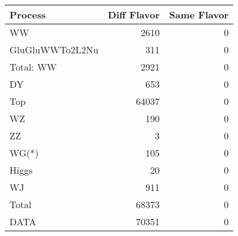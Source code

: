 \begin{table}[ht]
	\centering
\begin{tabular}{lrr}

         Process &  Diff Flavor &  Same Flavor \\
		\hline
              WW &         2610 &            0 \\
 GluGluWWTo2L2Nu &          311 &            0 \\
\hline
       Total: WW &         2921 &            0 \\
              DY &          653 &            0 \\
             Top &        64037 &            0 \\
              WZ &          190 &            0 \\
              ZZ &            3 &            0 \\
           WG(*) &          105 &            0 \\
           Higgs &           20 &            0 \\
              WJ &          911 &            0 \\
\hline
           Total &        68373 &            0 \\
            DATA &        70351 &            0 \\


\end{tabular}

\end{table}